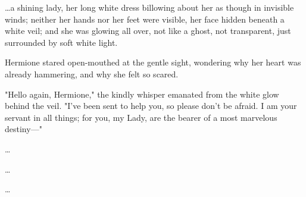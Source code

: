 {\ldots}a shining lady, her long white dress billowing about her as though in
invisible winds; neither her hands nor her feet were visible, her face hidden
beneath a white veil; and she was glowing all over, not like a ghost, not
transparent, just surrounded by soft white light.

Hermione stared open-mouthed at the gentle sight, wondering why her heart was
already hammering, and why she felt so scared.

"Hello again, Hermione," the kindly whisper emanated from the white glow behind
the veil. "I've been sent to help you, so please don't be afraid. I am your
servant in all things; for you, my Lady, are the bearer of a most marvelous
destiny---"

\begin{center}
{\ldots}

{\ldots}

{\ldots}
\end{center}
